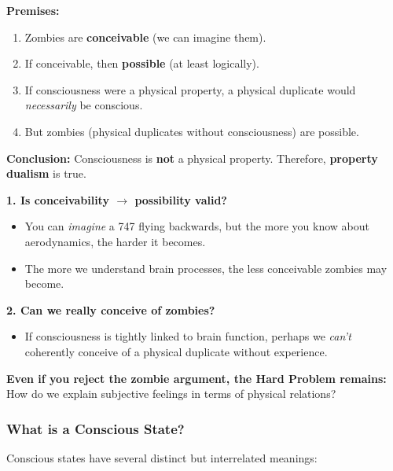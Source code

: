 \begin{thmbox}
\textbf{Premises:}
\begin{enumerate}
  \item Zombies are \textbf{conceivable} (we can imagine them).
  \item If conceivable, then \textbf{possible} (at least logically).
  \item If consciousness were a physical property, a physical duplicate would \textit{necessarily} be conscious.
  \item But zombies (physical duplicates without consciousness) are possible.
\end{enumerate}

\textbf{Conclusion:} Consciousness is \textbf{not} a physical property. Therefore, \textbf{property dualism} is true.
\end{thmbox}

\begin{exbox}
\textbf{1. Is conceivability $\to$ possibility valid?}
\begin{itemize}
  \item You can \textit{imagine} a 747 flying backwards, but the more you know about aerodynamics, the harder it becomes.
  \item The more we understand brain processes, the less conceivable zombies may become.
\end{itemize}

\textbf{2. Can we really conceive of zombies?}
\begin{itemize}
  \item If consciousness is tightly linked to brain function, perhaps we \textit{can't} coherently conceive of a physical duplicate without experience.
\end{itemize}

\textbf{Even if you reject the zombie argument, the Hard Problem remains:} How do we explain subjective feelings in terms of physical relations?
\end{exbox}

\bigseparator

\subsubsection{What is a Conscious State?}

Conscious states have several distinct but interrelated meanings:


